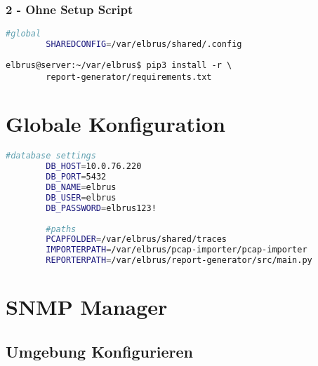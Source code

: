 \documentclass{article}
\begin{document}
	\subsubsection{2 - Ohne Setup Script}
	\begin{lstlisting}[caption={Anhand von '.env.example' eigene '.env' Datei anlegen.}, language=bash]
		#global
		SHAREDCONFIG=/var/elbrus/shared/.config
	\end{lstlisting}
	
	\begin{lstlisting}[caption={Installieren von fehlenden python3 Packages.}]
		elbrus@server:~/var/elbrus$ pip3 install -r \
		report-generator/requirements.txt
	\end{lstlisting}
	\newpage
	
	\section{Globale Konfiguration}
	\lstset{style=files}
	\begin{lstlisting}[caption={Anhand von '.config.example' eigene '.config' Datei in \newline'/var/elbrus/shared' anlegen.}, language=bash]
		#database settings
		DB_HOST=10.0.76.220
		DB_PORT=5432
		DB_NAME=elbrus
		DB_USER=elbrus
		DB_PASSWORD=elbrus123!
		
		#paths
		PCAPFOLDER=/var/elbrus/shared/traces
		IMPORTERPATH=/var/elbrus/pcap-importer/pcap-importer
		REPORTERPATH=/var/elbrus/report-generator/src/main.py
	\end{lstlisting}
	\newpage
	
	\section{SNMP Manager}
	\lstset{style=commands}

	\subsection[file config]{Umgebung Konfigurieren}
\end{document}
